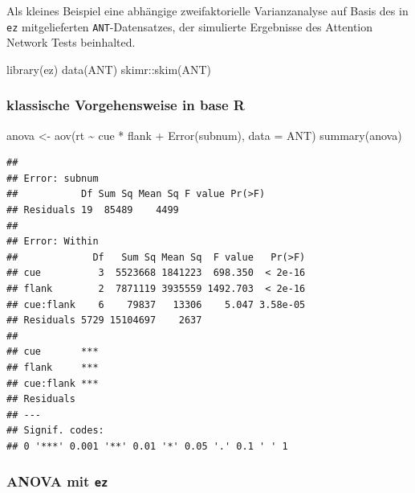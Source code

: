 \documentclass[
]{book}
\newenvironment{Shaded}{\begin{snugshade}}{\end{snugshade}}
\newcommand{\AttributeTok}[1]{\textcolor[rgb]{0.77,0.63,0.00}{#1}}
\newcommand{\FunctionTok}[1]{\textcolor[rgb]{0.00,0.00,0.00}{#1}}
\newcommand{\NormalTok}[1]{#1}
\newcommand{\OtherTok}[1]{\textcolor[rgb]{0.56,0.35,0.01}{#1}}
\newcommand{\SpecialCharTok}[1]{\textcolor[rgb]{0.00,0.00,0.00}{#1}}
\begin{document}
Als kleines Beispiel eine abhängige zweifaktorielle Varianzanalyse auf Basis des in \texttt{ez} mitgelieferten \texttt{ANT}-Datensatzes, der simulierte Ergebnisse des Attention Network Tests beinhalted.

\begin{Shaded}
\begin{Highlighting}[]
\FunctionTok{library}\NormalTok{(ez)}
\FunctionTok{data}\NormalTok{(ANT)}
\NormalTok{skimr}\SpecialCharTok{::}\FunctionTok{skim}\NormalTok{(ANT)}
\end{Highlighting}
\end{Shaded}

\hypertarget{klassische-vorgehensweise-in-base-r}{%
\subsubsection{klassische Vorgehensweise in base R}\label{klassische-vorgehensweise-in-base-r}}

\begin{Shaded}
\begin{Highlighting}[]
\NormalTok{anova }\OtherTok{\textless{}{-}} \FunctionTok{aov}\NormalTok{(rt }\SpecialCharTok{\textasciitilde{}}\NormalTok{ cue }\SpecialCharTok{*}\NormalTok{ flank }\SpecialCharTok{+} \FunctionTok{Error}\NormalTok{(subnum), }\AttributeTok{data =}\NormalTok{ ANT)}
\FunctionTok{summary}\NormalTok{(anova)}
\end{Highlighting}
\end{Shaded}

\begin{verbatim}
## 
## Error: subnum
##           Df Sum Sq Mean Sq F value Pr(>F)
## Residuals 19  85489    4499               
## 
## Error: Within
##             Df   Sum Sq Mean Sq  F value   Pr(>F)
## cue          3  5523668 1841223  698.350  < 2e-16
## flank        2  7871119 3935559 1492.703  < 2e-16
## cue:flank    6    79837   13306    5.047 3.58e-05
## Residuals 5729 15104697    2637                  
##              
## cue       ***
## flank     ***
## cue:flank ***
## Residuals    
## ---
## Signif. codes:  
## 0 '***' 0.001 '**' 0.01 '*' 0.05 '.' 0.1 ' ' 1
\end{verbatim}

\hypertarget{anova-mit-ez}{%
\subsubsection{\texorpdfstring{ANOVA mit \texttt{ez}}{ANOVA mit ez}}\label{anova-mit-ez}}
\end{document}
